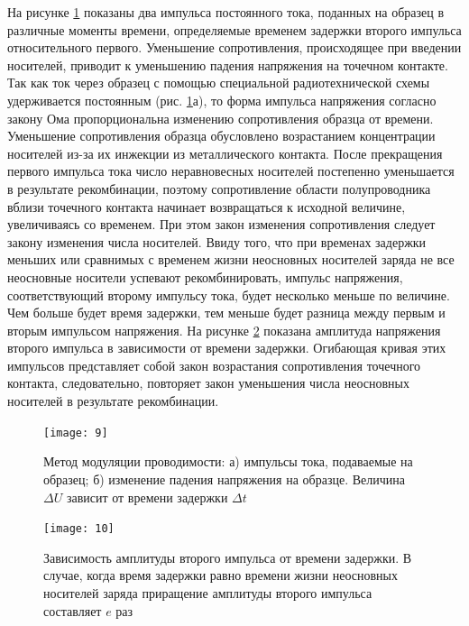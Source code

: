 \documentclass[a4paper,14pt]{extarticle}
\begin{document}
На рисунке \ref{fig:figure8} показаны два импульса постоянного тока, поданных на образец в различные моменты времени, определяемые временем задержки второго импульса относительного первого. Уменьшение сопротивления, происходящее при введении носителей, приводит к уменьшению падения напряжения на точечном контакте. Так как ток через образец с помощью специальной радиотехнической схемы удерживается постоянным (рис.  \ref{fig:figure8}а), то форма импульса напряжения согласно закону Ома пропорциональна изменению сопротивления образца от времени. Уменьшение сопротивления образца обусловлено возрастанием концентрации носителей из-за их инжекции из металлического контакта. После прекращения первого импульса тока число неравновесных носителей постепенно уменьшается в результате рекомбинации, поэтому сопротивление области полупроводника вблизи точечного контакта начинает возвращаться к исходной величине, увеличиваясь со временем. При этом закон изменения сопротивления следует закону изменения числа носителей. Ввиду того, что при временах задержки меньших или сравнимых с временем жизни неосновных носителей заряда не все неосновные носители успевают рекомбинировать, импульс напряжения, соответствующий второму импульсу тока, будет несколько меньше по величине. Чем больше будет время задержки, тем меньше будет разница между первым и вторым импульсом напряжения. На рисунке \ref{fig:figure9} показана амплитуда напряжения второго импульса в зависимости от времени задержки. Огибающая кривая этих импульсов представляет собой закон возрастания сопротивления точечного контакта, следовательно, повторяет закон уменьшения числа неосновных носителей в результате рекомбинации.

\begin{figure}[H]
	\centering
	\texttt{[image: 9]}
	\caption{Метод модуляции проводимости: а) импульсы тока, подаваемые на образец; б) изменение падения напряжения на образце. Величина $\Delta U$ зависит от времени задержки $\Delta t$}
	\label{fig:figure8}
\end{figure}

\begin{figure}[H]
	\centering
	\texttt{[image: 10]}
	\caption{Зависимость амплитуды второго импульса от времени задержки. В случае, когда время задержки равно времени жизни неосновных носителей заряда приращение амплитуды второго импульса составляет $e$ раз}
	\label{fig:figure9}
\end{figure}
\end{document}
